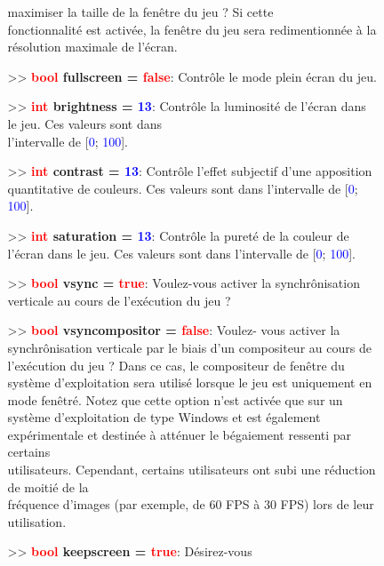 \documentclass[a4paper, 11pt]{article}
\begin{document}
\begin{description}
\begin{itemize}
\begin{itemize}
				maximiser la taille de la fenêtre du jeu ? Si cette \\fonctionnalité est activée, la fenêtre 
				du jeu sera redimentionnée à la résolution maximale de l'écran.\\
				\item[>> \textbf{\textcolor{red}{bool} fullscreen = \textcolor{red}{false}}:] Contrôle le 
				mode plein écran du jeu.\\
				\item[>> \textbf{\textcolor{red}{int} brightness = \textcolor{blue}{13}}:] Contrôle la 
				luminosité de l'écran dans le jeu. Ces valeurs sont dans \\l'intervalle de [\textcolor{blue}
				{0}; \textcolor{blue}{100}].\\
				\item[>> \textbf{\textcolor{red}{int} contrast = \textcolor{blue}{13}}:] Contrôle l'effet 
				subjectif d'une apposition quantitative de couleurs. Ces valeurs sont dans l'intervalle de 
				[\textcolor{blue}{0}; \textcolor{blue}{100}].\\
				\item[>> \textbf{\textcolor{red}{int} saturation = \textcolor{blue}{13}}:] Contrôle la 
				pureté de la couleur de l'écran dans le jeu. Ces valeurs sont dans l'intervalle de 
				[\textcolor{blue}{0}; \textcolor{blue}{100}].\\
				\item[>> \textbf{\textcolor{red}{bool} vsync = \textcolor{red}{true}}:] Voulez-vous activer 
				la synchrônisation verticale au cours de l'exécution du jeu ?\\
				\item[>> \textbf{\textcolor{red}{bool} vsyncompositor = \textcolor{red}{false}}:] Voulez-
				vous activer la synchrônisation verticale par le biais d'un compositeur au cours de
				l'exécution du jeu ? Dans ce cas, le compositeur de fenêtre du système d'exploitation sera 
				utilisé lorsque le jeu est uniquement en mode fenêtré. Notez que cette option n'est activée 
				que sur un système d'exploitation de type Windows et est également expérimentale et destinée 
				à atténuer le bégaiement ressenti par certains \\utilisateurs. Cependant, certains 
				utilisateurs ont subi une réduction de moitié de la \\fréquence d'images (par exemple, de 60
				FPS à 30 FPS) lors de leur utilisation.\\
				\item[>> \textbf{\textcolor{red}{bool} keepscreen = \textcolor{red}{true}}:] Désirez-vous 

\end{itemize}
\end{itemize}
\end{description}
\end{document}
